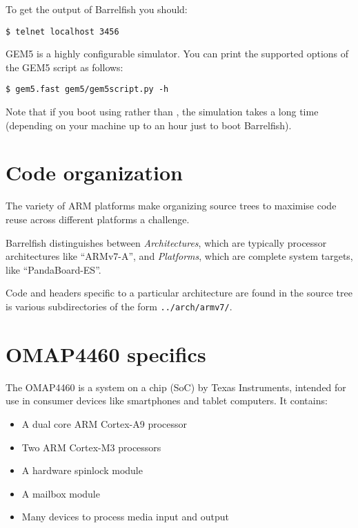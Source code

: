 \documentclass[a4paper,twoside]{report} %
\begin{document}
To get the output of Barrelfish you should:
\begin{lstlisting}
$ telnet localhost 3456
\end{lstlisting}

GEM5 is a highly configurable simulator.  You can print the supported
options of the GEM5 script as follows:

\begin{lstlisting}
$ gem5.fast gem5/gem5script.py -h
\end{lstlisting}

Note that if you boot using  rather than
, the simulation takes a long time (depending on
your machine up to an hour just to boot Barrelfish). 

\chapter{Code organization}

The variety of ARM platforms make organizing source trees to maximise
code reuse across different platforms a challenge. 

Barrelfish distinguishes between \emph{Architectures}, which are
typically processor architectures like ``ARMv7-A'', and \emph{Platforms},
which are complete system targets, like ``PandaBoard-ES''. 

Code and headers specific to a particular architecture are found in
the source tree is various subdirectories of the form
\texttt{../arch/armv7/}.  

\chapter{OMAP4460 specifics}


The OMAP4460 is a system on a chip (SoC) by Texas Instruments,
intended for use in consumer devices like smartphones and tablet
computers. It contains:

\begin{itemize}
\item A dual core ARM Cortex-A9 processor
\item Two ARM Cortex-M3 processors
\item A hardware spinlock module
\item A mailbox module
\item Many devices to process media input and output
\end{itemize}
\end{document}

